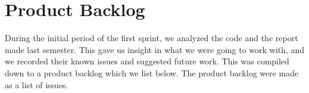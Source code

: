 \section{Product Backlog}\label{spr1_prodback}
During the initial period of the first sprint, we analyzed the code and the report made last semester. This gave us insight in what we were going to work with, and we recorded their known issues and suggested future work. This was compiled down to a product backlog which we list below. The product backlog were made as a list of issues.

